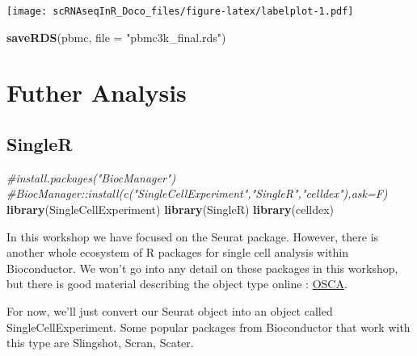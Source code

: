 \documentclass[
]{book}
\newenvironment{Shaded}{\begin{snugshade}}{\end{snugshade}}
\newcommand{\AttributeTok}[1]{\textcolor[rgb]{0.13,0.29,0.53}{#1}}
\newcommand{\CommentTok}[1]{\textcolor[rgb]{0.56,0.35,0.01}{\textit{#1}}}
\newcommand{\FunctionTok}[1]{\textcolor[rgb]{0.13,0.29,0.53}{\textbf{#1}}}
\newcommand{\NormalTok}[1]{#1}
\newcommand{\StringTok}[1]{\textcolor[rgb]{0.31,0.60,0.02}{#1}}
\begin{document}
\texttt{[image: scRNAseqInR\_Doco\_files/figure-latex/labelplot-1.pdf]}

\begin{Shaded}
\begin{Highlighting}[]
\FunctionTok{saveRDS}\NormalTok{(pbmc, }\AttributeTok{file =} \StringTok{"pbmc3k\_final.rds"}\NormalTok{)}
\end{Highlighting}
\end{Shaded}

\hypertarget{part-futher-analysis}{%
\part{Futher Analysis}\label{part-futher-analysis}}

\hypertarget{singler}{%
\chapter{SingleR}\label{singler}}

\begin{Shaded}
\begin{Highlighting}[]
\CommentTok{\#install.packages("BiocManager")}
\CommentTok{\#BiocManager::install(c("SingleCellExperiment","SingleR","celldex"),ask=F)}
\FunctionTok{library}\NormalTok{(SingleCellExperiment)}
\FunctionTok{library}\NormalTok{(SingleR)}
\FunctionTok{library}\NormalTok{(celldex)}
\end{Highlighting}
\end{Shaded}

In this workshop we have focused on the Seurat package. However, there is another whole ecosystem of R packages for single cell analysis within Bioconductor. We won't go into any detail on these packages in this workshop, but there is good material describing the object type online : \href{https://robertamezquita.github.io/orchestratingSingleCellAnalysis/data-infrastructure.html}{OSCA}.

For now, we'll just convert our Seurat object into an object called SingleCellExperiment. Some popular packages from Bioconductor that work with this type are Slingshot, Scran, Scater.
\end{document}
